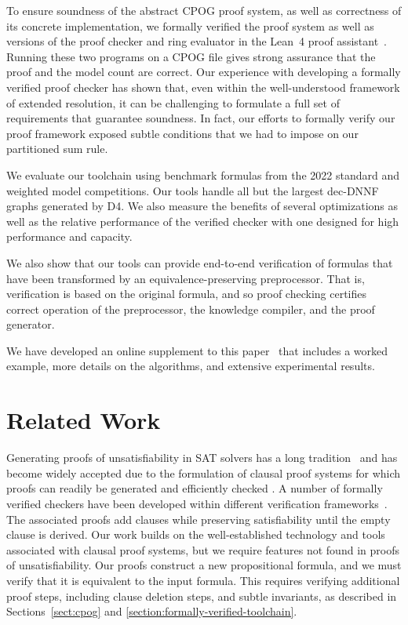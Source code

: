 \documentclass[letterpaper,USenglish,cleveref, autoref, thm-restate]{lipics-v2021}
\newcommand{\progname}[1]{\textsc{#1}}
\newcommand{\dfour}{\progname{D4}}
\newcommand{\lean}{Lean~4}
\begin{document}
To ensure soundness of the abstract CPOG proof system, as well as
correctness of its concrete implementation, we formally verified the
proof system as well as versions of the proof checker and ring
evaluator in the \lean{} proof assistant~\cite{demoura:cade:2021}.
Running these two programs on a  CPOG file gives strong
assurance that the proof and the model count are correct. Our
experience with developing a formally verified proof checker has shown
that, even within the well-understood framework of extended
resolution, it can be challenging to formulate a full set of
requirements that guarantee soundness.  In fact, our efforts to
formally verify our proof framework exposed subtle conditions that we had
to impose on our partitioned sum rule.

We evaluate our toolchain using benchmark formulas from the 2022
standard and weighted model competitions.  Our tools handle all but
the largest dec-DNNF graphs generated by \dfour{}.  We also measure
the benefits of several optimizations as well as the relative
performance of the verified checker with one designed for high
performance and capacity.

We also show that our tools can provide end-to-end verification of
formulas that have been transformed by an equivalence-preserving
preprocessor.  That is, verification is based on the original formula,
and so proof checking certifies correct operation of the preprocessor,
the knowledge compiler, and the proof generator.

We have developed an online supplement to this
paper~\cite{bryant:sat:2023:supplement} that includes
a worked example, more details on the algorithms,
and extensive experimental results.  

\section{Related Work}


Generating proofs of unsatisfiability in SAT solvers has a long
tradition~\cite{ZhangMalik} and has become widely accepted due to the
formulation of clausal proof systems for which proofs can readily be
generated and efficiently checked
\cite{heule:cade:2013,wetzler14_drattrim}.
A number of formally verified checkers have been developed within different verification frameworks~\cite{cruz-cade-2017,lrat,Lammich:20,Tan:2021}.
The associated proofs add clauses while preserving satisfiability until the empty clause is derived.
Our work builds on the well-established technology and tools associated with clausal proof systems,
but we require features not found in proofs of unsatisfiability.
Our proofs construct a new propositional formula, and we must verify
that it
is equivalent to the input formula.  This requires verifying
additional proof steps, including clause deletion steps, and subtle
invariants, as described in Sections~\ref{sect:cpog} and
\ref{section:formally-verified-toolchain}.
\end{document}
